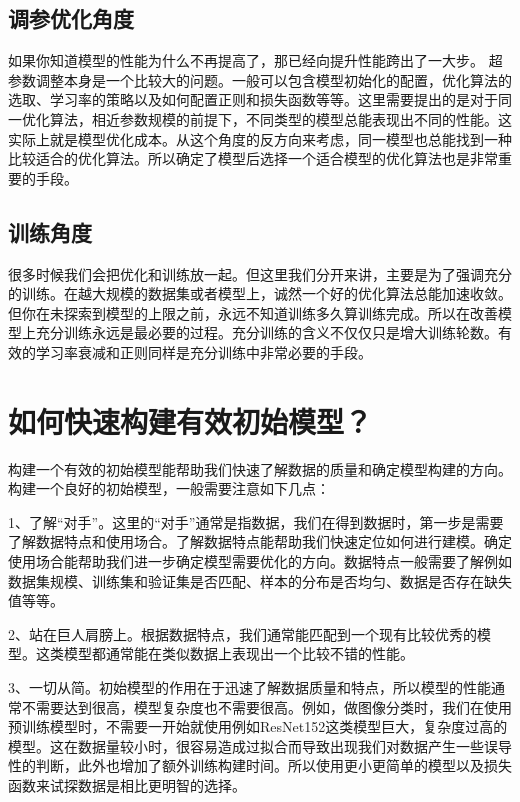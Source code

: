 \subsection{调参优化角度}\label{ux8c03ux53c2ux4f18ux5316ux89d2ux5ea6}

如果你知道模型的性能为什么不再提高了，那已经向提升性能跨出了一大步。
超参数调整本身是一个比较大的问题。一般可以包含模型初始化的配置，优化算法的选取、学习率的策略以及如何配置正则和损失函数等等。这里需要提出的是对于同一优化算法，相近参数规模的前提下，不同类型的模型总能表现出不同的性能。这实际上就是模型优化成本。从这个角度的反方向来考虑，同一模型也总能找到一种比较适合的优化算法。所以确定了模型后选择一个适合模型的优化算法也是非常重要的手段。

\subsection{ 训练角度}\label{ux8badux7ec3ux89d2ux5ea6}

很多时候我们会把优化和训练放一起。但这里我们分开来讲，主要是为了强调充分的训练。在越大规模的数据集或者模型上，诚然一个好的优化算法总能加速收敛。但你在未探索到模型的上限之前，永远不知道训练多久算训练完成。所以在改善模型上充分训练永远是最必要的过程。充分训练的含义不仅仅只是增大训练轮数。有效的学习率衰减和正则同样是充分训练中非常必要的手段。

\section{如何快速构建有效初始模型？}\label{ux5982ux4f55ux5febux901fux6784ux5efaux6709ux6548ux521dux59cbux6a21ux578b}

​
构建一个有效的初始模型能帮助我们快速了解数据的质量和确定模型构建的方向。构建一个良好的初始模型，一般需要注意如下几点：

​
1、了解``对手''。这里的``对手''通常是指数据，我们在得到数据时，第一步是需要了解数据特点和使用场合。了解数据特点能帮助我们快速定位如何进行建模。确定使用场合能帮助我们进一步确定模型需要优化的方向。数据特点一般需要了解例如数据集规模、训练集和验证集是否匹配、样本的分布是否均匀、数据是否存在缺失值等等。

​
2、站在巨人肩膀上。根据数据特点，我们通常能匹配到一个现有比较优秀的模型。这类模型都通常能在类似数据上表现出一个比较不错的性能。

​
3、一切从简。初始模型的作用在于迅速了解数据质量和特点，所以模型的性能通常不需要达到很高，模型复杂度也不需要很高。例如，做图像分类时，我们在使用预训练模型时，不需要一开始就使用例如ResNet152这类模型巨大，复杂度过高的模型。这在数据量较小时，很容易造成过拟合而导致出现我们对数据产生一些误导性的判断，此外也增加了额外训练构建时间。所以使用更小更简单的模型以及损失函数来试探数据是相比更明智的选择。

